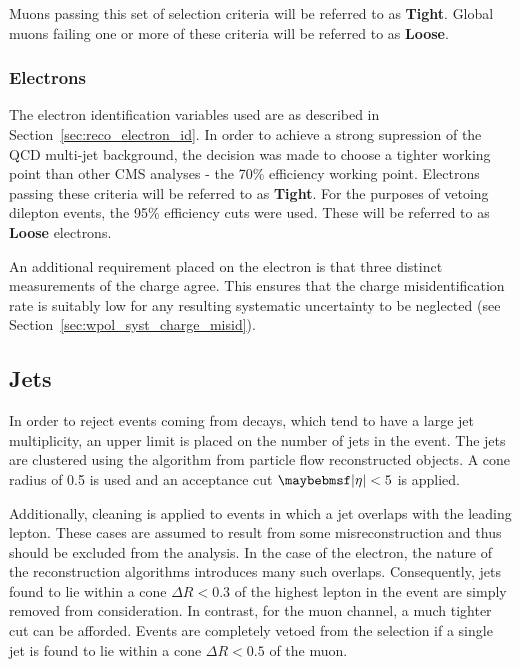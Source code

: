 Muons passing this set of selection criteria will be referred to as
\textbf{Tight}. Global muons failing one or more of these criteria will be
referred to as \textbf{Loose}.

\subsubsection{Electrons}
\label{sec:wpol_electronid}
The electron identification variables used are as described in
Section~\ref{sec:reco_electron_id}. In order to achieve a strong supression of
the \ac{QCD} multi-jet background, the decision was made to choose a tighter
working point than other \ac{CMS} analyses - the 70\% efficiency working
point. Electrons passing these criteria will be referred to as
\textbf{Tight}. For the purposes of vetoing dilepton events, the 95\% efficiency
cuts were used. These will be referred to as \textbf{Loose} electrons.

An additional requirement placed on the electron is that three distinct
measurements of the charge agree. This ensures that the charge misidentification
rate is suitably low for any resulting systematic uncertainty to be neglected
(see Section~\ref{sec:wpol_syst_charge_misid}).

\subsection{Jets}
\label{sec:wpol_jets}
In order to reject events coming from \ttbar decays, which tend to have a large
jet multiplicity, an upper limit is placed on the number of jets in the
event. The jets are clustered using the \antikT algorithm from particle flow
reconstructed objects. A cone radius of 0.5 is used and an acceptance cut
$\modeta < 5$ is applied.

Additionally, cleaning is applied to events in which a jet overlaps with the
leading lepton. These cases are assumed to result from some misreconstruction
and thus should be excluded from the analysis. In the case of the electron, the
nature of the reconstruction algorithms introduces many such
overlaps. Consequently, jets found to lie within a cone $\Delta R < 0.3$ of the
highest \Pt lepton in the event are simply removed from consideration. In
contrast, for the muon channel, a much tighter cut can be afforded. Events are
completely vetoed from the selection if a single jet is found to lie within a
cone $\Delta R < 0.5$ of the muon.

